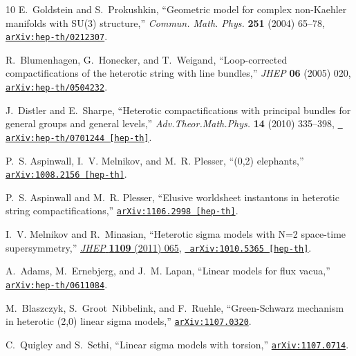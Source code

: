 \documentclass[11pt, a4paper]{article}
\begin{document}
\begin{thebibliography}{10}
E.~Goldstein and S.~Prokushkin, ``{Geometric model for complex non-Kaehler
  manifolds with SU(3) structure},'' {\em Commun. Math. Phys.} {\bf 251} (2004)
   65--78,
\href{http://arxiv.org/abs/hep-th/0212307}{{\tt arXiv:hep-th/0212307}}.

R.~Blumenhagen, G.~Honecker, and T.~Weigand, ``{Loop-corrected
  compactifications of the heterotic string with line bundles},'' {\em JHEP}
  {\bf 06} (2005)  020,
\href{http://arxiv.org/abs/hep-th/0504232}{{\tt arXiv:hep-th/0504232}}.

J.~Distler and E.~Sharpe, ``{Heterotic compactifications with principal bundles
  for general groups and general levels},'' {\em Adv.Theor.Math.Phys.} {\bf 14}
  (2010)  335--398, \href{http://arxiv.org/abs/hep-th/0701244}{{\tt
  arXiv:hep-th/0701244 [hep-th]}}.

P.~S. Aspinwall, I.~V. Melnikov, and M.~R. Plesser, ``{(0,2) elephants},''
\href{http://arxiv.org/abs/1008.2156}{{\tt arXiv:1008.2156 [hep-th]}}.

P.~S. Aspinwall and M.~R. Plesser, ``{Elusive worldsheet instantons in
  heterotic string compactifications},''
  \href{http://arxiv.org/abs/1106.2998}{{\tt arXiv:1106.2998 [hep-th]}}.

I.~V. Melnikov and R.~Minasian, ``{Heterotic sigma models with N=2 space-time
  supersymmetry},'' \href{http://dx.doi.org/10.1007/JHEP09(2011)065}{{\em JHEP}
  {\bf 1109} (2011)  065}, \href{http://arxiv.org/abs/1010.5365}{{\tt
  arXiv:1010.5365 [hep-th]}}.

A.~Adams, M.~Ernebjerg, and J.~M. Lapan, ``{Linear models for flux vacua},''
\href{http://arxiv.org/abs/hep-th/0611084}{{\tt arXiv:hep-th/0611084}}.

M.~Blaszczyk, S.~Groot~Nibbelink, and F.~Ruehle, ``{Green-Schwarz mechanism in
  heterotic (2,0) linear sigma models},''
  \href{http://arxiv.org/abs/1107.0320}{{\tt arXiv:1107.0320}}.

C.~Quigley and S.~Sethi, ``{Linear sigma models with torsion},''
  \href{http://arxiv.org/abs/1107.0714}{{\tt arXiv:1107.0714}}.

\end{thebibliography}\endgroup
\end{document}
